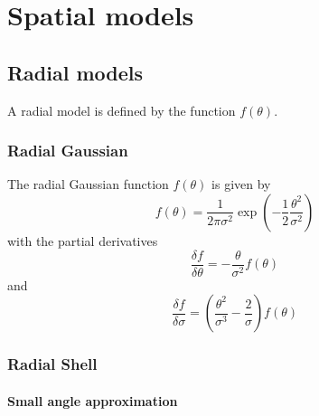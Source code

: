 \documentclass{article}[12pt,a4]
\begin{document}
\section{Spatial models}

\subsection{Radial models}

A radial model is defined by the function $f(\theta)$.


\subsubsection{Radial Gaussian}

The radial Gaussian function $f(\theta)$ is given by
\begin{equation}
f(\theta) = \frac{1}{2 \pi \sigma^2} \exp \left( -\frac{1}{2} \frac{\theta^2}{\sigma^2} \right)
\end{equation}
with the partial derivatives
\begin{equation}
\frac{\delta f}{\delta \theta}  = - \frac{\theta}{\sigma^2} f(\theta)
\end{equation}
and
\begin{equation}
\frac{\delta f}{\delta \sigma}  = \left( \frac{\theta^2}{\sigma^3} - \frac{2}{\sigma} \right) f(\theta)
\end{equation}

\subsubsection{Radial Shell}

\paragraph{Small angle approximation}
\end{document}
